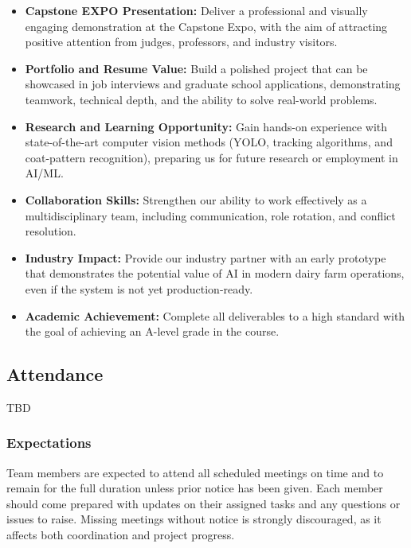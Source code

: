 \documentclass{article}
\begin{document}
\begin{itemize}
  \item \textbf{Capstone EXPO Presentation:} Deliver a professional and visually engaging demonstration
        at the Capstone Expo, with the aim of attracting positive attention from judges, professors, 
        and industry visitors.
  \item \textbf{Portfolio and Resume Value:} Build a polished project that can be showcased in 
        job interviews and graduate school applications, demonstrating teamwork, technical depth, 
        and the ability to solve real-world problems.
  \item \textbf{Research and Learning Opportunity:} Gain hands-on experience with state-of-the-art
        computer vision methods (YOLO, tracking algorithms, and coat-pattern recognition), 
        preparing us for future research or employment in AI/ML.
  \item \textbf{Collaboration Skills:} Strengthen our ability to work effectively as a multidisciplinary 
        team, including communication, role rotation, and conflict resolution.
  \item \textbf{Industry Impact:} Provide our industry partner with an early prototype that 
        demonstrates the potential value of AI in modern dairy farm operations, 
        even if the system is not yet production-ready.
  \item \textbf{Academic Achievement:} Complete all deliverables to a high standard with the goal of 
        achieving an A-level grade in the course.
\end{itemize}

\subsection*{Attendance}
{\color{red} TBD}

\subsubsection*{Expectations}

Team members are expected to attend all scheduled meetings on time and to remain for the full
duration unless prior notice has been given. Each member should come prepared with updates 
on their assigned tasks and any questions or issues to raise. Missing meetings without notice 
is strongly discouraged, as it affects both coordination and project progress.
\end{document}
